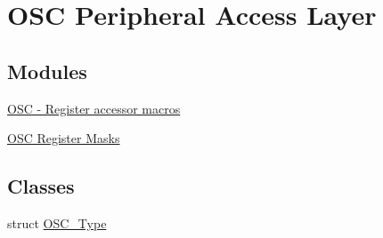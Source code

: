 \hypertarget{group__OSC__Peripheral__Access__Layer}{}\section{O\+SC Peripheral Access Layer}
\label{group__OSC__Peripheral__Access__Layer}
\subsection*{Modules}
\begin{DoxyCompactItemize}
\item 
\hyperlink{group__OSC__Register__Accessor__Macros}{O\+S\+C -\/ Register accessor macros}
\item 
\hyperlink{group__OSC__Register__Masks}{O\+S\+C Register Masks}
\end{DoxyCompactItemize}
\subsection*{Classes}
\begin{DoxyCompactItemize}
\item 
struct \hyperlink{structOSC__Type}{O\+S\+C\+\_\+\+Type}
\end{DoxyCompactItemize}
